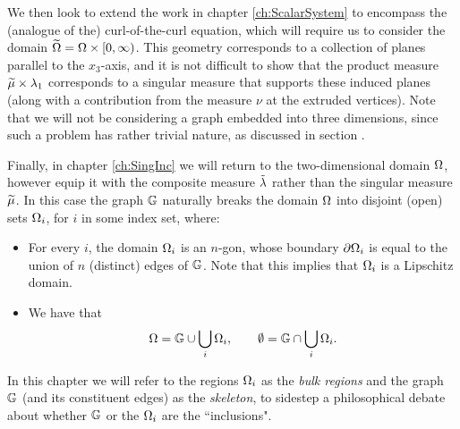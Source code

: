 We then look to extend the work in chapter \ref{ch:ScalarSystem} to encompass the (analogue of the) curl-of-the-curl equation, which will require us to consider the domain $\widetilde{\Omega} = \Omega\times[0,\infty)$.
This geometry corresponds to a collection of planes parallel to the $x_3$-axis, and it is not difficult to show that the product measure $\widetilde{\mu}\times\lambda_1$ corresponds to a singular measure that supports these induced planes (along with a contribution from the measure $\nu$ at the extruded vertices).
Note that we will not be considering a graph embedded into three dimensions, since such a problem has rather trivial nature, as discussed in section .

Finally, in chapter \ref{ch:SingInc} we will return to the two-dimensional domain $\Omega$, however equip it with the composite measure $\tilde{\lambda}$ rather than the singular measure $\widetilde{\mu}$.
In this case the graph $\mathbb{G}$ naturally breaks the domain $\Omega$ into disjoint (open) sets $\Omega_i$, for $i$ in some index set, where:
\begin{itemize}
	\item For every $i$, the domain $\Omega_i$ is an $n$-gon, whose boundary $\partial\Omega_i$ is equal to the union of $n$ (distinct) edges of $\mathbb{G}$.
	Note that this implies that $\Omega_i$ is a Lipschitz domain.
	\item We have that
	\begin{align*}
		\Omega = \mathbb{G} \cup \bigcup_{i}\Omega_i,
		\qquad
		\emptyset = \mathbb{G} \cap \bigcup_{i}\Omega_i.
	\end{align*}
\end{itemize}
In this chapter we will refer to the regions $\Omega_i$ as the \emph{bulk regions} and the graph $\mathbb{G}$ (and its constituent edges) as the \emph{skeleton}, to sidestep a philosophical debate about whether $\mathbb{G}$ or the $\Omega_i$ are the ``inclusions".